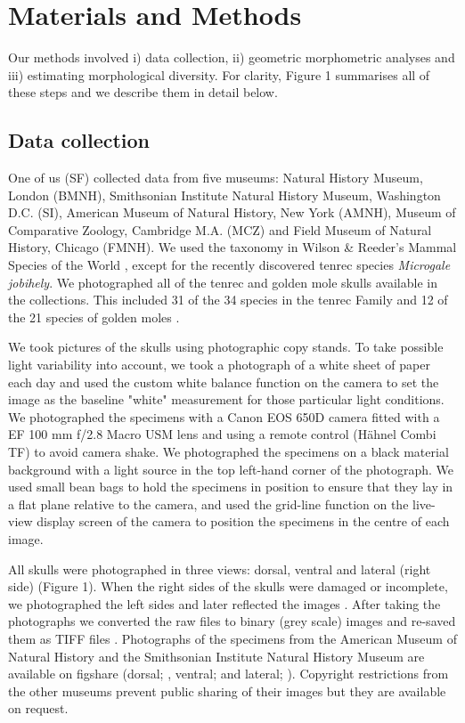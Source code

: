 \documentclass[12pt,a4paper]{article}
\begin{document}
\section{Materials and Methods}

	Our methods involved i) data collection, ii) geometric morphometric analyses and iii) estimating morphological diversity. For clarity,  Figure 1 summarises all of these steps and we describe them in detail below.  	
	
\subsection{Data collection}
	One of us (SF) collected data from five museums: Natural History Museum, London (BMNH), Smithsonian Institute Natural History Museum, Washington D.C. (SI), American Museum of Natural History, New York (AMNH), Museum of Comparative Zoology, Cambridge M.A. (MCZ) and Field Museum of Natural History, Chicago (FMNH). We used the taxonomy in Wilson \& Reeder's Mammal Species of the World \citeyearpar{Wilson2005}, except for the recently discovered tenrec species \textit{Microgale jobihely}. We photographed all of the tenrec and golden mole skulls available in the collections. This included 31 of the 34 species in the tenrec Family \citep{Olson2013} and 12 of the 21 species of golden moles \citep{Wilson2005}.
	
	We took pictures of the skulls using photographic copy stands. To take possible light variability into account, we took a photograph of a white sheet of paper each day and used the custom white balance function on the camera to set the image as the baseline "white" measurement for those particular light conditions. We photographed the specimens with a Canon EOS 650D camera fitted with a EF 100 mm f/2.8 Macro USM lens and using a remote control (H\"ahnel Combi TF) to avoid camera shake. We photographed the specimens on a black material background with a light source in the top left-hand corner of the photograph. We used small bean bags to hold the specimens in position to ensure that they lay in a flat plane relative to the camera, and used the grid-line function on the live-view display screen of the camera to position the specimens in the centre of each image. 
	
	All skulls were photographed in three views: dorsal, ventral and lateral (right side) (Figure 1). When the right sides of the skulls were damaged or incomplete, we photographed the left sides and later reflected the images \citep[e.g.][]{Barrow2008}. After taking the photographs we converted the raw files to binary (grey scale) images and re-saved them as TIFF files \citep[uncompressed files preserve greater detail, ][]{RHOI2013}. Photographs of the specimens from the American Museum of Natural History and the Smithsonian Institute Natural History Museum are available on figshare (dorsal; \citet{Finlay2013d}, ventral; \citet{Finlay2013v} and lateral; \citet{Finlay2013l}). Copyright restrictions from the other museums prevent public sharing of their images but they are available on request.
\end{document}
